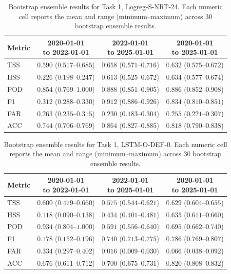 \begin{table}[htbp]
\centering
\small
\caption{Bootstrap ensemble results for Task 1, Logreg-S-NRT-24. Each numeric cell reports the mean and range (minimum--maximum) across 30 bootstrap ensemble results.}
\label{tab:app-task1-logreg-s-nrt-24}
\begin{tabular}{lccc}
\toprule
Metric & \shortstack{2020-01-01\\to 2022-01-01} & \shortstack{2022-01-01\\to 2025-01-01} & \shortstack{2020-01-01\\to 2025-01-01} \\
\midrule
TSS & $0.590$ ($0.517$--$0.685$) & $0.658$ ($0.571$--$0.716$) & $0.632$ ($0.575$--$0.672$) \\
HSS & $0.226$ ($0.198$--$0.247$) & $0.613$ ($0.525$--$0.672$) & $0.634$ ($0.577$--$0.674$) \\
POD & $0.854$ ($0.769$--$1.000$) & $0.888$ ($0.851$--$0.905$) & $0.886$ ($0.852$--$0.908$) \\
F1 & $0.312$ ($0.288$--$0.330$) & $0.912$ ($0.886$--$0.926$) & $0.834$ ($0.810$--$0.851$) \\
FAR & $0.263$ ($0.235$--$0.315$) & $0.230$ ($0.183$--$0.304$) & $0.255$ ($0.221$--$0.307$) \\
ACC & $0.744$ ($0.706$--$0.769$) & $0.864$ ($0.827$--$0.885$) & $0.818$ ($0.790$--$0.838$) \\
\bottomrule
\end{tabular}
\end{table}
\clearpage

\begin{table}[htbp]
\centering
\small
\caption{Bootstrap ensemble results for Task 1, LSTM-O-DEF-0. Each numeric cell reports the mean and range (minimum--maximum) across 30 bootstrap ensemble results.}
\label{tab:app-task1-lstm-o-def-0}
\begin{tabular}{lccc}
\toprule
Metric & \shortstack{2020-01-01\\to 2022-01-01} & \shortstack{2022-01-01\\to 2025-01-01} & \shortstack{2020-01-01\\to 2025-01-01} \\
\midrule
TSS & $0.600$ ($0.479$--$0.660$) & $0.575$ ($0.544$--$0.621$) & $0.629$ ($0.604$--$0.655$) \\
HSS & $0.118$ ($0.090$--$0.138$) & $0.434$ ($0.401$--$0.481$) & $0.635$ ($0.611$--$0.660$) \\
POD & $0.934$ ($0.804$--$1.000$) & $0.591$ ($0.556$--$0.640$) & $0.695$ ($0.662$--$0.740$) \\
F1 & $0.178$ ($0.152$--$0.196$) & $0.740$ ($0.713$--$0.775$) & $0.786$ ($0.769$--$0.807$) \\
FAR & $0.334$ ($0.297$--$0.402$) & $0.016$ ($0.009$--$0.030$) & $0.066$ ($0.038$--$0.092$) \\
ACC & $0.676$ ($0.611$--$0.712$) & $0.700$ ($0.675$--$0.731$) & $0.820$ ($0.808$--$0.832$) \\
\bottomrule
\end{tabular}
\end{table}
\clearpage

